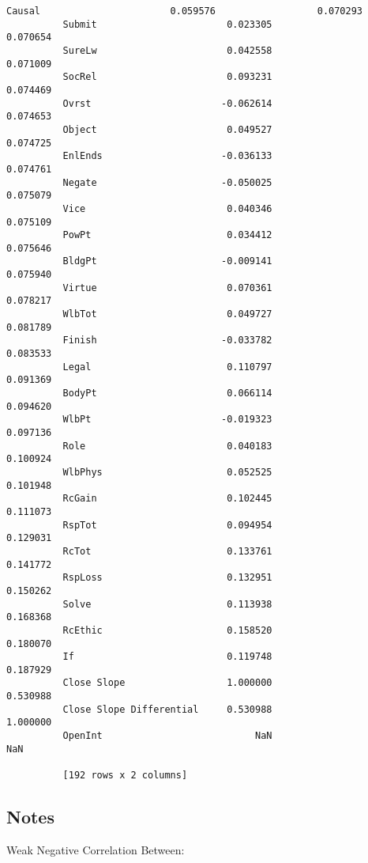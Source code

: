 \documentclass[11pt]{article}
\begin{document}
\begin{Verbatim}[commandchars=\\\{\}]
          Causal                       0.059576                  0.070293
          Submit                       0.023305                  0.070654
          SureLw                       0.042558                  0.071009
          SocRel                       0.093231                  0.074469
          Ovrst                       -0.062614                  0.074653
          Object                       0.049527                  0.074725
          EnlEnds                     -0.036133                  0.074761
          Negate                      -0.050025                  0.075079
          Vice                         0.040346                  0.075109
          PowPt                        0.034412                  0.075646
          BldgPt                      -0.009141                  0.075940
          Virtue                       0.070361                  0.078217
          WlbTot                       0.049727                  0.081789
          Finish                      -0.033782                  0.083533
          Legal                        0.110797                  0.091369
          BodyPt                       0.066114                  0.094620
          WlbPt                       -0.019323                  0.097136
          Role                         0.040183                  0.100924
          WlbPhys                      0.052525                  0.101948
          RcGain                       0.102445                  0.111073
          RspTot                       0.094954                  0.129031
          RcTot                        0.133761                  0.141772
          RspLoss                      0.132951                  0.150262
          Solve                        0.113938                  0.168368
          RcEthic                      0.158520                  0.180070
          If                           0.119748                  0.187929
          Close Slope                  1.000000                  0.530988
          Close Slope Differential     0.530988                  1.000000
          OpenInt                           NaN                       NaN
          
          [192 rows x 2 columns]
\end{Verbatim}
            
    \subsection{Notes}\label{notes}

Weak Negative Correlation Between:
\end{document}
